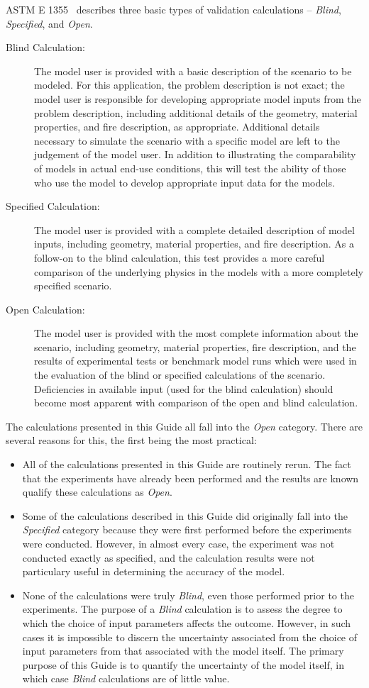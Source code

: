 ASTM E 1355~\cite{ASTM:E1355} describes three basic types of validation calculations -- {\em Blind}, {\em Specified}, and
{\em Open}.
\begin{description}
\item [Blind Calculation:] The model user is provided with a basic description of the scenario to be modeled. For this application, the problem description is not exact; the model user is responsible for developing appropriate model inputs from the problem description, including additional details of the geometry, material properties, and fire description, as appropriate. Additional details necessary to simulate the scenario with a specific model are left to the judgement of the model user. In addition to illustrating the comparability of models in actual end-use conditions, this will test the ability of those who use the model to develop appropriate input data for the models.
\item [Specified Calculation:] The model user is provided with a complete detailed description of model inputs, including geometry, material properties, and fire description. As a follow-on to the blind calculation, this test provides a more careful comparison of the underlying physics in the models with a more completely specified scenario.
\item [Open Calculation:] The model user is provided with the most complete information about the scenario, including geometry, material properties, fire description, and the results of experimental tests or benchmark model runs which were used in the evaluation of the blind or specified calculations of the scenario. Deficiencies in available input (used for the blind calculation) should become most apparent with comparison of the open and blind calculation.
\end{description}
The calculations presented in this Guide all fall into the {\em Open} category. There are several reasons for this, the first being the most practical:
\begin{itemize}
\item All of the calculations presented in this Guide are routinely rerun. The fact that the experiments have already been performed and the results are known qualify these calculations as {\em Open}.
\item Some of the calculations described in this Guide did originally fall into the {\em Specified} category because they were first performed before the experiments were conducted. However, in almost every case, the experiment was not conducted exactly as specified, and the calculation results were not particulary useful in determining the accuracy of the model. \item None of the calculations were truly {\em Blind}, even those performed prior to the experiments. The purpose of a {\em Blind} calculation is to assess the degree to which the choice of input parameters affects the outcome. However, in such cases it is impossible to discern the uncertainty associated from the choice of input parameters from that associated with the model itself. The primary purpose of this Guide is to quantify the uncertainty of the model itself, in which case {\em Blind} calculations are of little value.
\end{itemize}


